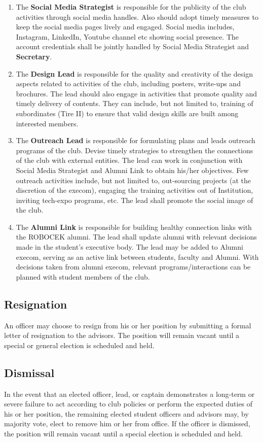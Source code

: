 \begin{enumerate}
	\item The \textbf{Social Media Strategist} is responsible for the publicity of the club activities through social media handles. Also should adopt timely measures to keep the social media pages lively and engaged. Social media includes, Instagram, LinkedIn, Youtube channel etc showing social presence. The account credentials shall be jointly handled by Social Media Strategist and \textbf{Secretary}.
	
	\item The \textbf{Design Lead} is responsible for the quality and creativity of the design aspects related to activities of the club, including posters, write-ups and brochures. The lead should also engage in activities that promote quality and timely delivery of contents. They can include, but not limited to, training of subordinates (Tire II) to ensure that valid design skills are built among interested members.
	
	\item The \textbf{Outreach Lead} is responsible for formulating plans and leads outreach programs of the club. Devise timely strategies to strengthen the connections of the club with external entities. The lead can work in conjunction with Social Media Strategist and Alumni Link to obtain his/her objectives. Few outreach activities include, but not limited to, out-sourcing projects (at the discretion of the execom), engaging the training activities out of Institution, inviting tech-expo programs, etc. The lead shall promote the social image of the club.
	
	\item The \textbf{Alumni Link} is responsible for building healthy connection links with the ROBOCEK alumni. The lead shall update alumni with relevant decisions made in the student's executive body. The lead may be added to Alumni execom, serving as an active link between students, faculty and Alumni. With decisions taken from alumni execom, relevant programs/interactions can be planned with student members of the club.
	
\end{enumerate}

\subsection{Resignation}
An officer may choose to resign from his or her position by submitting a formal letter of resignation to the advisors. The position will remain vacant until a special or general election is scheduled and held.

\subsection{Dismissal}
In the event that an elected officer, lead, or captain demonstrates a long-term or severe failure to act according to club policies or perform the expected duties of his or her position, the remaining elected student officers and advisors may, by majority vote, elect to remove him or her from office. If the officer is dismissed, the position will remain vacant until a special election is scheduled and held.
